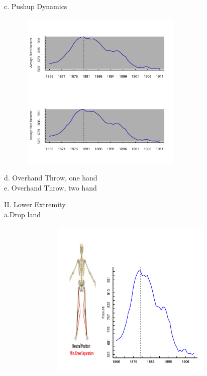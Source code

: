 \documentclass{article}\usepackage[]{graphicx}\usepackage[]{color}
\newenvironment{knitrout}{}{} %
\begin{document}
c. Pushup Dynamics
\begin{knitrout}
\color{fgcolor}

\includegraphics[width=4in,height=3in]{figure/latex-unnamed-chunk-4-1} \hfill{}



\end{knitrout}
d. Overhand Throw, one hand\\


e. Overhand Throw, two hand\\

\newpage

II. Lower Extremity\\
	a.Drop land

\begin{knitrout}
\color{fgcolor}

\includegraphics[width=6in,height=3in]{figure/latex-unnamed-chunk-5-1} \hfill{}



\end{knitrout}
\end{document}

